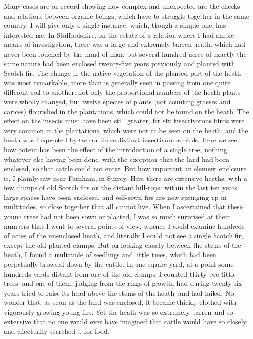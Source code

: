 \indent Many cases are on record showing how complex and unexpected are the checks and relations between organic beings, which have to struggle together in the same country.  I will give only a single instance, which, though a simple one, has interested me. In Staffordshire, on the estate of a relation where I had ample means of investigation, there was a large and extremely barren heath, which had never been touched by the hand of man; but several hundred acres of exactly the same nature had been enclosed twenty-five years previously and planted with Scotch fir. The change in the native vegetation of the planted part of the heath was most remarkable, more than is generally seen in passing from one quite different soil to another: not only the proportional numbers of the heath-plants were wholly changed, but twelve species of plants (not counting grasses and carices) flourished in the plantations, which could not be found on the heath. The effect on the insects must have been still greater, for six insectivorous birds were very common in the plantations, which were not to be seen on the heath; and the heath was frequented by two or three distinct insectivorous birds. Here we see how potent has been the effect of the introduction of a single tree, nothing whatever else having been done, with the exception that the land had been enclosed, so that cattle could not enter. But how important an element enclosure is, I plainly saw near Farnham, in Surrey. Here there are extensive heaths, with a few clumps of old Scotch firs on the distant hill-tops: within the last ten years large spaces have been enclosed, and self-sown firs are now springing up in multitudes, so close together that all cannot live.  When I ascertained that these young trees had not been sown or planted, I was so much surprised at their numbers that I went to several points of view, whence I could examine hundreds of acres of the unenclosed heath, and literally I could not see a single Scotch fir, except the old planted clumps. But on looking closely between the stems of the heath, I found a multitude of seedlings and little trees, which had been perpetually browsed down by the cattle. In one square yard, at a point some hundreds yards distant from one of the old clumps, I counted thirty-two little trees; and one of them, judging from the rings of growth, had during twenty-six years tried to raise its head above the stems of the heath, and had failed.  No wonder that, as soon as the land was enclosed, it became thickly clothed with vigorously growing young firs. Yet the heath was so extremely barren and so extensive that no one would ever have imagined that cattle would have so closely and effectually searched it for food.\\
